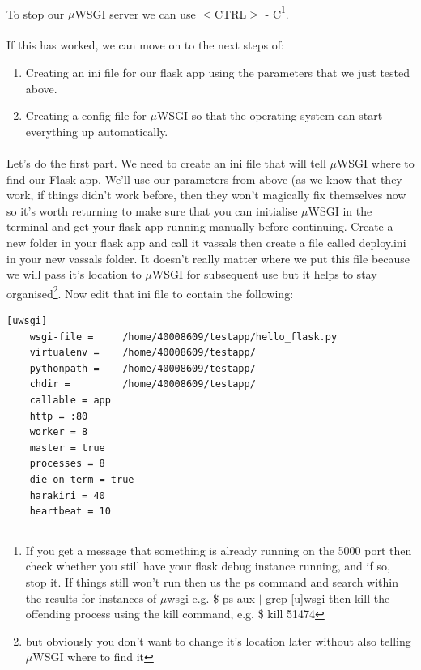 \documentclass[12pt, a4paper, oneside]{book}
\begin{document}
\paragraph{} To stop our $\mu$WSGI server we can use $<$CTRL$>$ - C\footnote{If you get a message that something is already running on the 5000 port then check whether you still have your flask debug instance running, and if so, stop it. If things still won't run then us the ps command and search within the results for instances of $\mu$wsgi e.g. \$ ps aux $|$ grep [u]wsgi then kill the offending process using the kill command, e.g. \$ kill 51474}.

\paragraph{} If this has worked, we can move on to the next steps of:

\begin{enumerate}
\item Creating an ini file for our flask app using the parameters that we just tested above.
\item Creating a config file for $\mu$WSGI so that the operating system can start everything up automatically.
\end{enumerate}

\paragraph{} Let's do the first part. We need to create an ini file that will tell $\mu$WSGI where to find our Flask app. We'll use our parameters from above (as we know that they work, if things didn't work before, then they won't magically fix themselves now so it's worth returning to make sure that you can initialise $\mu$WSGI in the terminal and get your flask app running manually before continuing. Create a new folder in your flask app and call it vassals then create a file called deploy.ini in your new vassals folder. It doesn't really matter where we put this file because we will pass it's location to $\mu$WSGI for subsequent use but it helps to stay organised\footnote{but obviously you don't want to change it's location later without also telling $\mu$WSGI where to find it}. Now edit that ini file to contain the following:

\begin{lstlisting}
[uwsgi]
	wsgi-file = 	/home/40008609/testapp/hello_flask.py
	virtualenv = 	/home/40008609/testapp/
	pythonpath = 	/home/40008609/testapp/
	chdir = 	    /home/40008609/testapp/
  	callable = app
	http = :80
	worker = 8
	master = true
	processes = 8
	die-on-term = true
	harakiri = 40
	heartbeat = 10
\end{lstlisting}
\end{document}
